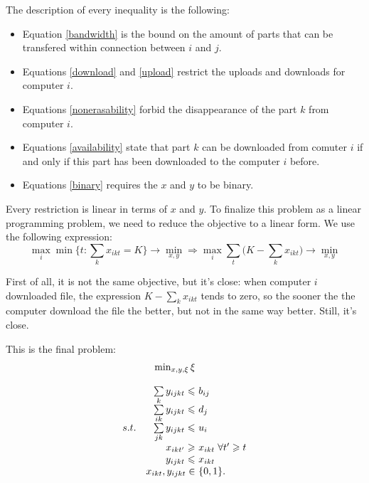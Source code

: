 \documentclass[10pt,a4paper]{article}
\begin{document}
The description of every inequality is the following:
\begin{itemize}
	\item Equation \eqref{bandwidth} is the bound on the amount of parts that can be transfered within connection between $i$ and $j$.
	\item Equations \eqref{download} and \eqref{upload} restrict the uploads and downloads for computer $i$.
	\item Equations \eqref{nonerasability} forbid the disappearance of the part $k$ from computer $i$.
	\item Equations \eqref{availability} state that part $k$ can be downloaded from comuter $i$ if and only if this part has been downloaded to the computer $i$ before.
	\item Equations \eqref{binary} requires the $x$ and $y$ to be binary.
\end{itemize}

Every restriction is linear in terms of $x$ and $y$. To finalize this problem as a linear programming problem, we need to reduce the objective to a linear form. We use the following expression:
\begin{equation}
	\max_{i} \min \{t: \sum_k x_{ikt} = K \} \to \min_{x,y} \Rightarrow \max_i \sum_t \Big( K - \sum_k x_{ikt} \Big) \to \min_{x, y}
\end{equation}

First of all, it is not the same objective, but it's close: when computer $i$ downloaded file, the expression $K - \sum_k x_{ikt}$ tends to zero, so the sooner the the computer download the file the better, but not in the same way better. Still, it's close.

This is the final problem:
\begin{align*}
	\begin{array}{rrll}
	& \min_{x, y, \xi} \xi \\ 
	\ \\
	& \sum\limits_k y_{ijkt} \leqslant & \mkern-12mu b_{ij} \\ 
	& \sum\limits_{ik} y_{ijkt} \leqslant & \mkern-12mu d_j \\ 
	s. t. & \sum\limits_{jk} y_{ijkt} \leqslant & \mkern-12mu u_i \\ 
	& x_{ikt'} \geqslant & \mkern-12mu x_{ikt} & \mkern-32mu \forall t' \geqslant t  \\ 
	& y_{ijkt} \leqslant & \mkern-12mu x_{ikt} \\
	& x_{ikt}, y_{ijkt} \in & \mkern-12mu \{0, 1 \}.
	\end{array} 
\end{align*}
\end{document}
